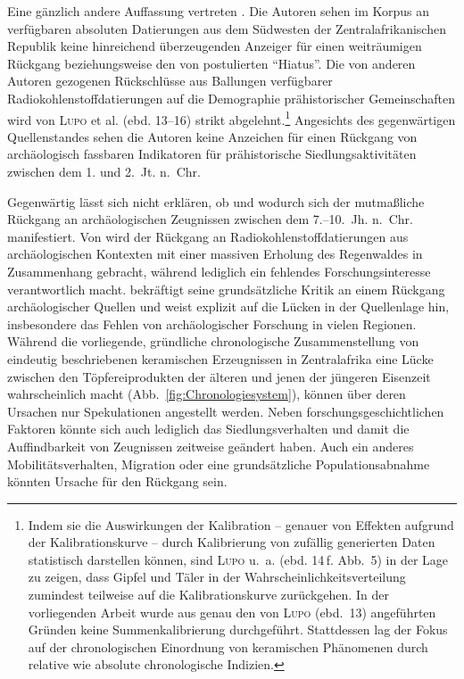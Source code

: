 Eine gänzlich andere Auffassung vertreten \textcite{Lupo.2018}. Die Autoren sehen im Korpus an verfügbaren absoluten Datierungen aus dem Südwesten der Zentralafrikanischen Republik keine hinreichend überzeugenden Anzeiger für einen weiträumigen Rückgang beziehungsweise den von \textcites[101--103~Abb.~9]{Oslisly.1998}[112\,f.~Abb.~7.9]{Oslisly.2001d}{Oslisly.2013}{Oslisly.2013b} postulierten \enquote{Hiatus}. Die von anderen Autoren gezogenen Rückschlüsse aus Ballungen verfügbarer Radiokohlenstoffdatierungen auf die Demographie prähistorischer Gemeinschaften wird von \textsc{Lupo} et al. (ebd. 13--16) strikt abgelehnt.\footnote{Indem sie die Auswirkungen der Kalibration -- genauer von Effekten aufgrund der Kalibrationskurve -- durch Kalibrierung von zufällig generierten Daten statistisch darstellen können, sind \textsc{Lupo} u.~a. (ebd. 14\,f. Abb.~5) in der Lage zu zeigen, dass Gipfel und Täler in der Wahrscheinlichkeitsverteilung zumindest teilweise auf die Kalibrationskurve zurückgehen. In der vorliegenden Arbeit wurde aus genau den von \textsc{Lupo} (ebd.~13) angeführten Gründen keine Summenkalibrierung durchgeführt. Stattdessen lag der Fokus auf der chronologischen Einordnung von keramischen Phänomenen durch relative wie absolute chronologische Indizien.} Angesichts des gegenwärtigen Quellenstandes sehen die Autoren keine Anzeichen für einen Rückgang von archäologisch fassbaren Indikatoren für prähistorische Siedlungsaktivitäten zwischen dem 1. und 2.~Jt. n.~Chr.

Gegenwärtig lässt sich nicht erklären, ob und wodurch sich der mutmaßliche Rückgang an archäologischen Zeugnissen zwischen dem 7.--10.~Jh. n.~Chr. manifestiert. Von \textcite[282]{Wotzka.2006b} wird der Rückgang an Radiokohlenstoffdatierungen aus archäologischen Kontexten mit einer massiven Erholung des Regenwaldes in Zusammenhang gebracht, während \textcite{Clist.1995} lediglich ein fehlendes Forschungsinteresse verantwortlich macht. \textcite[236\,f.]{Clist.2018a} bekräftigt seine grundsätzliche Kritik an einem Rückgang archäologischer Quellen und weist explizit auf die Lücken in der Quellenlage hin, insbesondere das Fehlen von archäologischer Forschung in vielen Regionen. Während die vorliegende, gründliche chronologische Zusammenstellung von eindeutig beschriebenen keramischen Erzeugnissen in Zentralafrika eine Lücke zwischen den Töpfereiprodukten der älteren und jenen der jüngeren Eisenzeit wahrscheinlich macht (Abb.~\ref{fig:Chronologiesystem}), können über deren Ursachen nur Spekulationen angestellt werden. Neben forschungsgeschichtlichen Faktoren könnte sich auch lediglich das Siedlungsverhalten und damit die Auffindbarkeit von Zeugnissen zeitweise geändert haben. Auch ein anderes Mobilitätsverhalten, Migration oder eine grundsätzliche Populationsabnahme könnten Ursache für den Rückgang sein.

